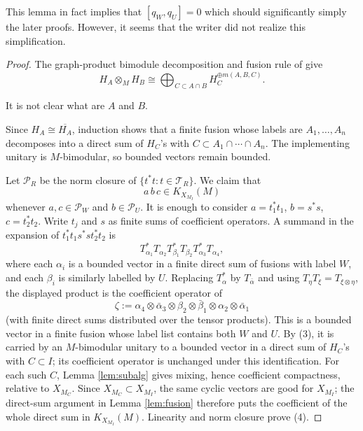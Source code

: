 \documentclass[12pt]{article}
\newcommand{\cT}{\mathcal T}
\newcommand{\review}[1]{\begin{reviewbox}#1\end{reviewbox}}
\begin{document}
\review{This lemma in fact implies that $ [q_W,q_U]=0 $ which should significantly simply the later proofs. However, it seems that the writer did not realize this simplification.}
\begin{proof}
The graph-product bimodule decomposition and fusion rule of
\cite[Theorem 5.4 and Proposition 5.5]{CDHJKN} give
\[
        H_A\otimes_M H_B\cong
        \bigoplus_{C\subset A\cap B}H_C^{\oplus m(A,B,C)} .        \tag{3}
\]
\review{It is not clear what are $A$ and $B$.}

Since \(H_A\cong\overline{H_A}\), induction shows that a finite fusion whose
labels are \(A_1,\ldots,A_n\) decomposes into a direct sum of \(H_C\)'s with
\(C\subset A_1\cap\cdots\cap A_n\).  The implementing unitary is
\(M\)-bimodular, so bounded vectors remain bounded.

Let \(\mathcal P_R\) be the norm closure of \(\{t^*t:t\in\cT_R\}\).  We claim
that
\[
        a\,b\,c\in K_{X_{M_I}}(M)             \tag{4}
\]
whenever \(a,c\in\mathcal P_W\) and \(b\in\mathcal P_U\).  It is enough to
consider \(a=t_1^*t_1\), \(b=s^*s\), \(c=t_2^*t_2\).  Write
\(t_j\) and \(s\) as finite sums of coefficient operators.  A summand in the
expansion of \(t_1^*t_1s^*st_2^*t_2\) is
\[
T_{\alpha_1}^*T_{\alpha_2}T_{\beta_1}^*T_{\beta_2}
T_{\alpha_3}^*T_{\alpha_4},
\]
where each \(\alpha_i\) is a bounded vector in a finite direct sum of fusions
with label \(W\), and each \(\beta_i\) is similarly labelled by \(U\).  Replacing
\(T_\alpha^*\) by \(T_{\bar\alpha}\) and using
\(T_\eta T_\xi=T_{\xi\otimes\eta}\), the displayed product is the coefficient
operator of
\[
 \zeta:=\alpha_4\otimes\bar\alpha_3\otimes\beta_2\otimes\bar\beta_1
 \otimes\alpha_2\otimes\bar\alpha_1
\]
(with finite direct sums distributed over the tensor products).  This is a
bounded vector in a finite fusion whose label list contains both \(W\) and
\(U\).  By (3), it is carried by an \(M\)-bimodular unitary to a bounded vector
in a direct sum of \(H_C\)'s with \(C\subset I\); its coefficient operator is
unchanged under this identification.  For each such \(C\), Lemma
\ref{lem:subalg} gives mixing, hence coefficient compactness, relative to
\(X_{M_C}\).  Since \(X_{M_C}\subset X_{M_I}\), the same cyclic vectors are good
for \(X_{M_I}\); the direct-sum argument in Lemma \ref{lem:fusion} therefore
puts the coefficient of the whole direct sum in \(K_{X_{M_I}}(M)\).  Linearity
and norm closure prove (4).


\end{proof}
\end{document}
